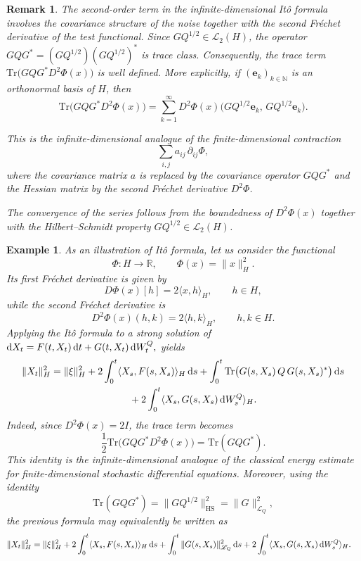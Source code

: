 \documentclass[12pt]{amsart}
\newcommand{\D}[1]{\mbox{\rm #1}}
\newcommand{\dd}{\D{d}}
\numberwithin{equation}{section}
\newtheorem{remark}[theorem]{Remark}
\newtheorem{ex}{Example}[section]
\begin{document}
\begin{remark}
The second-order term in the infinite-dimensional It\^o formula involves the covariance structure of the noise together with the second Fr\'echet derivative of the test functional. Since $GQ^{1/2}\in\mathscr L_2(H)$, 
the operator $GQG^*=(GQ^{1/2})(GQ^{1/2})^*$ 
is trace class. Consequently, the trace term $\mathrm{Tr}\big(GQG^*D^2\Phi(x)\big)$ is well defined. 
More explicitly, if $(\mathbf{e}_k)_{k\in\mathbb N}$ is an orthonormal basis of $H$, then
\[
    \mathrm{Tr}\big(GQG^*D^2\Phi(x)\big) = \sum_{k=1}^\infty D^2\Phi(x)\big( GQ^{1/2}\mathbf{e}_k,\, GQ^{1/2}\mathbf{e}_k \big).
\]

This is the infinite-dimensional analogue of the finite-dimensional contraction
\[
    \sum_{i,j} a_{ij}\,\partial_{ij}\Phi,
\]
where the covariance matrix $a$ is replaced by the covariance operator $GQG^*$ and the Hessian matrix by the second Fr\'echet derivative $D^2\Phi$.

The convergence of the series follows from the boundedness of $D^2\Phi(x)$ together with the Hilbert--Schmidt property $GQ^{1/2}\in\mathscr L_2(H)$.
\end{remark}



\begin{ex}\label{ex:Ito in H}
As an illustration of It\^{o} formula, let us consider the functional
\[
    \Phi:H\to\mathbb{R}, \qquad \Phi(x)=\|x\|_H^2.
\]
Its first Fr\'echet derivative is given by
\[
    D\Phi(x)[h] = 2\langle x,h\rangle_H, \qquad h\in H,
\]
while the second Fr\'echet derivative is
\[
    D^2\Phi(x)(h,k) = 2\langle h,k\rangle_H, \qquad h,k\in H.
\]
Applying the It\^o formula to a strong solution of $\dd X_t = F(t,X_t)\,\dd t + G(t,X_t)\,\dd W_t^Q,$ 
yields
\begin{align*}
\|X_t\|_H^2
    &= \|\xi\|_H^2 + 2\int_0^t \langle X_s,F(s,X_s)\rangle_H\,\dd s + \int_0^t \mathrm{Tr}\big(G(s,X_s)\,Q\,G(s,X_s)^*\big)\,\dd s \\
    &\qquad \qquad \qquad \qquad  + 2\int_0^t \langle X_s,G(s,X_s)\,\dd W_s^Q\rangle_H.
\end{align*}
Indeed, since $D^2\Phi(x)=2I$,  the trace term becomes
\[
    \frac{1}{2} \mathrm{Tr}\big( GQG^*D^2\Phi(x) \big) = \mathrm{Tr}(GQG^*).
\]
This identity is the infinite-dimensional analogue of the classical energy estimate for finite-dimensional stochastic differential equations.
Moreover, using the identity
\[
    \mathrm{Tr}(GQG^*) = \|GQ^{1/2}\|_{\mathrm{HS}}^2 = \|G\|_{\mathscr L_Q}^2,
\]
the previous formula may equivalently be written as
\begin{align*}
    \|X_t\|_H^2
    &= \|\xi\|_H^2 + 2\int_0^t \langle X_s,F(s,X_s)\rangle_H\,\dd s + \int_0^t \|G(s,X_s)\|_{\mathscr L_Q}^2\,\dd s +2\int_0^t\langle X_s,G(s,X_s)\,\dd W_s^Q\rangle_H.
\end{align*}
\end{ex}
\end{document}
